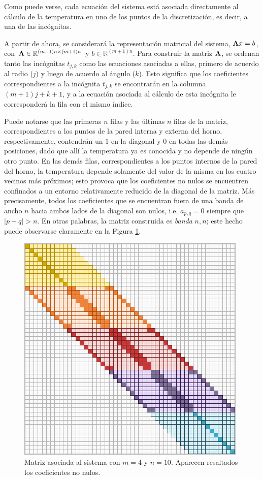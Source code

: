         Como puede verse, cada ecuación del sistema está asociada directamente al cálculo de la temperatura en uno de los puntos de la discretización, es decir, a una de las incógnitas.

        A partir de ahora, se considerará la representación matricial del sistema, $\mathbf{A}x=b$, con $\mathbf{A} \in \mathbb{R}^{(m+1)n \times (m+1)n}$ y $b \in \mathbb{R}^{(m+1)n}$. Para construir la matriz $\mathbf{A}$, se ordenan tanto las incógnitas $t_{j,k}$ como las ecuaciones asociadas a ellas, primero de acuerdo al radio ($j$) y luego de acuerdo al ángulo ($k$). Esto significa que los coeficientes correspondientes a la incógnita $t_{j,k}$ se encontrarán en la columna $(m+1)j + k + 1$, y a la ecuación asociada al cálculo de esta incógnita le corresponderá la fila con el mismo índice.

        Puede notarse que las primeras $n$ filas y las últimas $n$ filas de la matriz, correspondientes a los puntos de la pared interna y externa del horno, respectivamente, contendrán un $1$ en la diagonal y $0$ en todas las demás posiciones, dado que allí la temperatura ya es conocida y no depende de ningún otro punto. En las demás filas, correspondientes a los puntos internos de la pared del horno, la temperatura depende solamente del valor de la misma en los cuatro vecinos más próximos; esto provoca que los coeficientes no nulos se encuentren confinados a un entorno relativamente reducido de la diagonal de la matriz. Más precisamente, todos los coeficientes que se encuentran fuera de una banda de ancho $n$ hacia ambos lados de la diagonal son nulos, i.e. $a_{p,q} = 0$ siempre que $\vert p - q \vert > n$. En otras palabras, la matriz construida es \emph{banda} $n, n$; este hecho puede observarse claramente en la Figura \ref{fig:matriz-banda}.

        \begin{figure}[h]
          \centering

          \includegraphics{imagenes/matriz-banda.pdf}

          \caption{Matriz asociada al sistema con $m = 4$ y $n = 10$. Aparecen resaltados los coeficientes no nulos.}
          \label{fig:matriz-banda}
        \end{figure}

